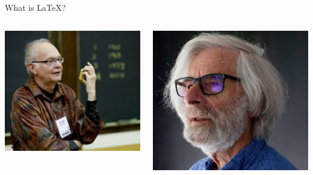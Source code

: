 \begin{frame}{What is LaTeX?}
    \begin{columns}
        \begin{column}{0.6\textwidth}
            \includegraphics[width=0.7\linewidth]{figs/knuth}
        \end{column}
        
        \begin{column}{0.4\textwidth}
            \includegraphics[width=0.8\linewidth]{figs/Lamport}
        \end{column}
    \end{columns}
\end{frame}

